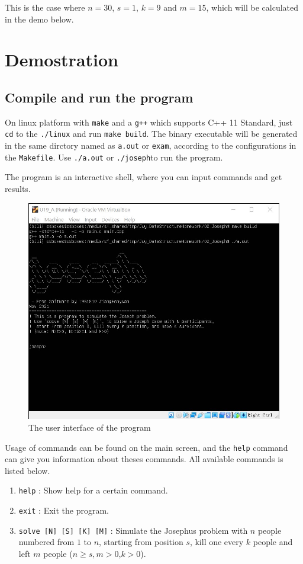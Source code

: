\documentclass[cn,black,12pt,normal]{elegantnote}
\begin{document}
This is the case where $n=30$, $s=1$, $k=9$ and $m=15$, which will be calculated in the demo below.

\section{Demostration}

\subsection{Compile and run the program}

On linux platform with \lstinline{make} and a \lstinline{g++} which supports C++ 11 Standard, just \lstinline{cd} to the \lstinline{./linux} and run \lstinline{make build}. The binary executable will be generated in the same dirctory named as \lstinline{a.out} or \lstinline{exam}, according to the configurations in the \lstinline{Makefile}. Use \lstinline{./a.out} or \lstinline{./joseph}to run the program.

The program is an interactive shell, where you can input commands and get results.

\begin{figure}[H]
    \centering
    \includegraphics[width=0.7\linewidth]{image/j01.jpg}
    \caption{The user interface of the program}
\end{figure}

Usage of commands can be found on the main screen, and the \lstinline{help} command can give you information about theses commands.  All available commands is listed below.

\begin{enumerate}
    \item \lstinline{help} : Show help for a certain command.
    \item \lstinline{exit} : Exit the program.
    \item \lstinline{solve [N] [S] [K] [M]} : Simulate the Josephus problem with $n$ people numbered from $1$ to $n$, starting from position $s$, kill one every $k$ people and left $m$ people ($n\geq s,m >0$,$k>0$).
\end{enumerate}
\end{document}
